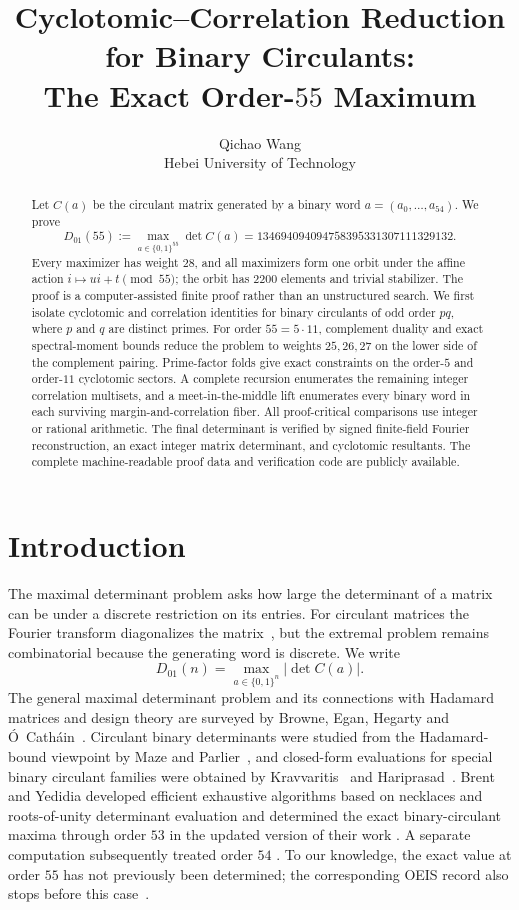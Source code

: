 \documentclass[11pt,a4paper]{article}
\title{Cyclotomic--Correlation Reduction for Binary Circulants:\\The Exact Order-$55$ Maximum}
\author{
  Qichao Wang\\
  Hebei University of Technology
}
\date{}
\theoremstyle{definition}
\theoremstyle{remark}
\newcommand{\M}{134694094094758395331307111329132}
\begin{document}
\maketitle

\begin{abstract}
Let $C(a)$ be the circulant matrix generated by a binary word
$a=(a_0,\ldots,a_{54})$.  We prove
\[
  D_{01}(55):=\max_{a\in\{0,1\}^{55}}\det C(a)
  =\M.
\]
Every maximizer has weight $28$, and all maximizers form one orbit under the
affine action $i\mapsto ui+t\pmod{55}$; the orbit has $2200$ elements and
trivial stabilizer.  The proof is a computer-assisted finite proof rather than
an unstructured search.  We first isolate cyclotomic and correlation identities
for binary circulants of odd order $pq$, where $p$ and $q$ are distinct primes.
For order $55=5\cdot11$, complement duality and exact spectral-moment bounds
reduce the problem to weights $25,26,27$ on the lower side of the complement
pairing.  Prime-factor folds give exact constraints on the order-$5$ and
order-$11$ cyclotomic sectors.  A complete recursion enumerates the remaining
integer correlation multisets, and a meet-in-the-middle lift enumerates every
binary word in each surviving margin-and-correlation fiber.  All proof-critical
comparisons use integer or rational arithmetic.  The final determinant is
verified by signed finite-field Fourier reconstruction, an exact integer matrix
determinant, and cyclotomic resultants.  The complete machine-readable proof
data and verification code are publicly available.
\end{abstract}

\section{Introduction}

The maximal determinant problem asks how large the determinant of a matrix can
be under a discrete restriction on its entries.  For circulant matrices the
Fourier transform diagonalizes the matrix~\cite{davis}, but the extremal problem remains
combinatorial because the generating word is discrete.  We write
\[
  D_{01}(n)=\max_{a\in\{0,1\}^n}|\det C(a)|.
\]
The general maximal determinant problem and its connections with Hadamard
matrices and design theory are surveyed by Browne, Egan, Hegarty and
\'O~Cath\'ain~\cite{browne-survey}.  Circulant binary determinants were studied
from the Hadamard-bound viewpoint by Maze and Parlier~\cite{maze-parlier}, and
closed-form evaluations for special binary circulant families were obtained by
Kravvaritis~\cite{kravvaritis} and Hariprasad~\cite{hariprasad}.  Brent and
Yedidia developed efficient exhaustive algorithms based on necklaces and
roots-of-unity determinant evaluation and determined the exact binary-circulant
maxima through order $53$ in the updated version of their work
\cite{brent-yedidia}.  A separate computation subsequently treated order $54$
\cite{aletheia54}.  To our knowledge, the exact value at order $55$ has not
previously been determined; the corresponding OEIS record also stops before
this case~\cite{oeis}.
\end{document}
